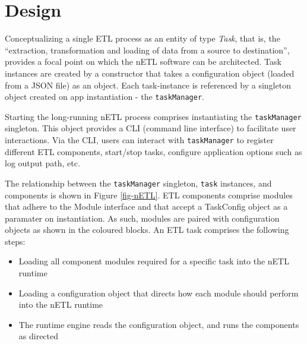 \section{Design}
Conceptualizing a single ETL process as an entity of type \textit{Task}, that is, the ``extraction, transformation and loading of data from a source to destination'', provides a focal point on which the nETL software can be architected. Task instances are created by a constructor that takes a configuration object (loaded from a JSON file) as an object. Each task-instance is referenced by a singleton object created on app instantiation - the \texttt{taskManager}.

Starting the long-running nETL process comprises instantiating the \texttt{taskManager} singleton. This object provides a CLI (command line interface) to facilitate user interactions. Via the CLI, users can interact with \texttt{taskManager} to register different ETL components, start/stop tasks, configure application options such as log output path, etc.

The relationship between the \texttt{taskManager} singleton, \texttt{task} instances, and components is shown in Figure \ref{fig-nETL}. ETL components comprise modules that adhere to the Module interface and that accept a TaskConfig object as a paramater on instantiation. As such, modules are paired with configuration objects as shown in the coloured blocks. An ETL task comprises the following steps:

\begin{itemize}
    \item Loading all component modules required for a specific task into the nETL runtime
    \item Loading a configuration object that directs how each module should perform into the nETL runtime
    \item The runtime engine reads the configuration object, and runs the components as directed
\end{itemize}

